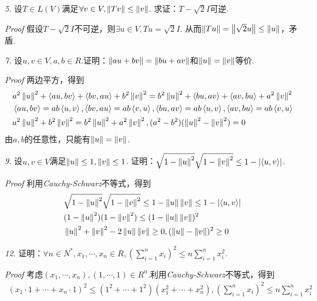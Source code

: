 \textit{5.}
设\(T \in L(V)\)满足\(\forall v \in V,\norm{Tv} \leq \norm{v}\).
求证：\(T-\sqrt{2}I\)可逆.

\textit{Proof}
假设\(T-\sqrt{2}I\)不可逆，则\(\exists u \in V,Tu=\sqrt{2}I\).
从而\(\norm{Tu}=\norm{\sqrt{2}u} \leq \norm{u}\)，矛盾.

\hspace*{\fill}

\textit{7.}
设\(u,v \in V,a,b \in R\).证明：\(\norm{au+bv}=\norm{bu+av}\)和\(\norm{u}=\norm{v}\)等价.

\textit{Proof}
两边平方，得到
    \begin{align*}
        &a^2\norm{u}^2+\ip{au}{bv}+\ip{bv}{au}+b^2\norm{v}^2=b^2\norm{u}^2+\ip{bu}{av}+\ip{av}{bu}+a^2\norm{v}^2 \\
        &\ip{au}{bv}=ab\ip{u}{v},\ip{bv}{au}=ab\ip{v}{u},\ip{bu}{av}=ab\ip{u}{v},\ip{av}{bu}=ab\ip{v}{u} \\
        &a^2\norm{u}^2+b^2\norm{v}^2=b^2\norm{u}^2+a^2\norm{v}^2,(a^2-b^2)(\norm{u}^2-\norm{v}^2)=0
    \end{align*}
由\(a,b\)的任意性，只能有\(\norm{u}=\norm{v}\).

\hspace*{\fill}

\textit{9.}
设\(u,v \in V\)满足\(\norm{u} \leq 1,\norm{v} \leq 1\).
证明：\(\sqrt{1-\norm{u}^2}\sqrt{1-\norm{v}^2} \leq 1-\abs{\ip{u}{v}}\).

\textit{Proof}
利用\textit{Cauchy-Schwarz}不等式，得到
    \begin{align*}
        &\sqrt{1-\norm{u}^2}\sqrt{1-\norm{v}^2} \leq 1-\norm{u}\norm{v} \leq 1-\abs{\ip{u}{v}} \\
        &(1-\norm{u}^2)(1-\norm{v}^2) \leq (1-\norm{u}\norm{v})^2 \\
        &\norm{u}^2+\norm{v}^2-2\norm{u}\norm{v} \geq 0,(\norm{u}-\norm{v})^2 \geq 0
    \end{align*}

\hspace*{\fill}

\textit{12.}
证明：\(\forall n \in N^*,x_1,\cdots,x_n \in R,(\sum_{i=1}^n x_i)^2 \leq n\sum_{i=1}^n x_i^2\).

\textit{Proof}
考虑\((x_1,\cdots,x_n),(1,\cdots,1) \in R^n\).利用\textit{Cauchy-Schwarz}不等式，得到
    \begin{align*}
        (x_1 \cdot 1+\cdots+x_n \cdot 1)^2 \leq (1^2+\cdots+1^2)(x_1^2+\cdots+x_n^2),
        (\sum_{i=1}^n x_i)^2 \leq n\sum_{i=1}^n x_i^2
    \end{align*}

